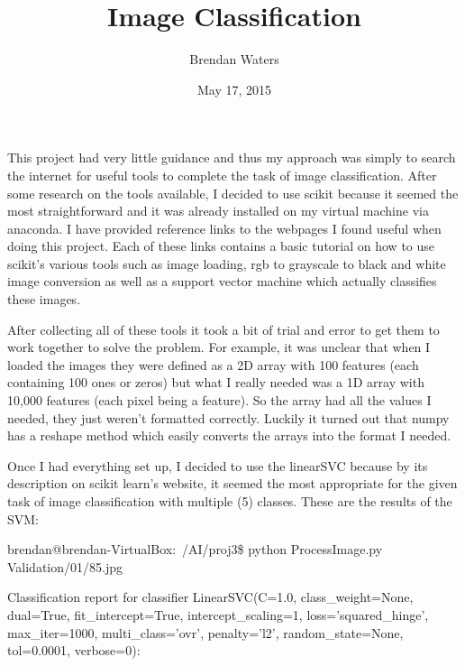 
\title{Image Classification}
\date{May 17, 2015}
\author{Brendan Waters}
\maketitle
This project had very little guidance and thus my approach was simply to search the internet for useful tools to complete the task of image classification. After some research on the tools available, I decided to use scikit because it seemed the most straightforward and it was already installed on my virtual machine via anaconda. I have provided reference links to the webpages I found useful when doing this project. Each of these links contains a basic tutorial on how to use scikit's various tools such as image loading, rgb to grayscale to black and white image conversion as well as a support vector machine which actually classifies these images.

After collecting all of these tools it took a bit of trial and error to get them to work together to solve the problem. For example, it was unclear that when I loaded the images they were defined as a 2D array with 100 features (each containing 100 ones or zeros) but what I really needed was a 1D array with 10,000 features (each pixel being a feature). So the array had all the values I needed, they just weren't formatted correctly. Luckily it turned out that numpy has a reshape method which easily converts the arrays into the format I needed.

Once I had everything set up, I decided to use the linearSVC because by its description on scikit learn's website, it seemed the most appropriate for the given task of image classification with multiple (5) classes. These are the results of the SVM:\newline

brendan@brendan-VirtualBox:~/AI/proj3\$ python ProcessImage.py Validation/01/85.jpg\newline

Classification report for classifier LinearSVC(C=1.0, class_weight=None, dual=True, fit_intercept=True, intercept_scaling=1, loss='squared_hinge', max_iter=1000, multi_class='ovr', penalty='l2', random_state=None, tol=0.0001, verbose=0):\newline
             
